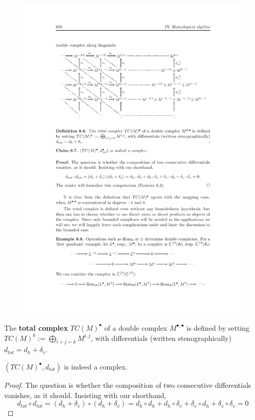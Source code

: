 \begin{figure}[!h]
\centering
\includegraphics{pictures/totcomp.pdf}
\end{figure}
\begin{definition}
The \textbf{total complex} $TC(M)^\bullet$ of a double complex $M^{\bullet,\bullet}$ is defined by setting $TC(M)^k:=\bigoplus_{i+j=k}M^{i,j}$, with differentials (written stenographically) $d_{tot}=d_h+\delta_v$.
\end{definition}
\begin{claim}
$(TC(M)^\bullet,d_{tot})$ is indeed a complex.
\end{claim}
\begin{proof}
The question is whether the composition of two consecutive differentials
vanishes, as it should. Insisting with our shorthand,
\[d_{tot}\circ d_{tot}=(d_h+\delta_v)\circ(d_h+\delta_v)=d_h\circ d_h+d_h\circ\delta_v+\delta_v\circ d_h+\delta_v\circ\delta_v=0\]
\end{proof}
